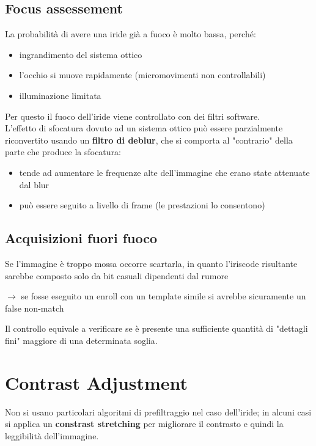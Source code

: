 \documentclass{report}
\begin{document}
\subsection{Focus assessement}
La probabilità di avere una iride già a fuoco è molto bassa, perché:
\begin{itemize}
    \item ingrandimento del sistema ottico 
    \item l'occhio si muove rapidamente (micromovimenti non controllabili)
    \item illuminazione limitata
\end{itemize}

\noindent Per questo il fuoco dell'iride viene controllato con dei filtri
software.\\


\noindent L'effetto di sfocatura dovuto ad un sistema ottico può essere parzialmente riconvertito
usando un \textbf{filtro di deblur}, che si comporta al "contrario" della parte 
che produce la sfocatura:
\begin{itemize}
    \item tende ad aumentare le frequenze alte dell'immagine che erano state attenuate dal blur 
    \item può essere seguito a livello di frame (le prestazioni lo consentono)
\end{itemize}

\subsection{Acquisizioni fuori fuoco}
Se l'immagine è troppo mossa occorre scartarla, in quanto l'iriscode risultante 
sarebbe composto solo da bit casuali dipendenti dal rumore 

$\rightarrow$ se fosse eseguito un enroll con un template simile si avrebbe sicuramente un false non-match

\noindent Il controllo equivale a verificare se è presente una sufficiente quantità di
"dettagli fini" maggiore di una determinata soglia.

\section{Contrast Adjustment}
Non si usano particolari algoritmi di prefiltraggio nel caso dell'iride;
in alcuni casi si applica un \textbf{constrast stretching} per migliorare il contrasto 
e quindi la leggibilità dell'immagine.
\end{document}
